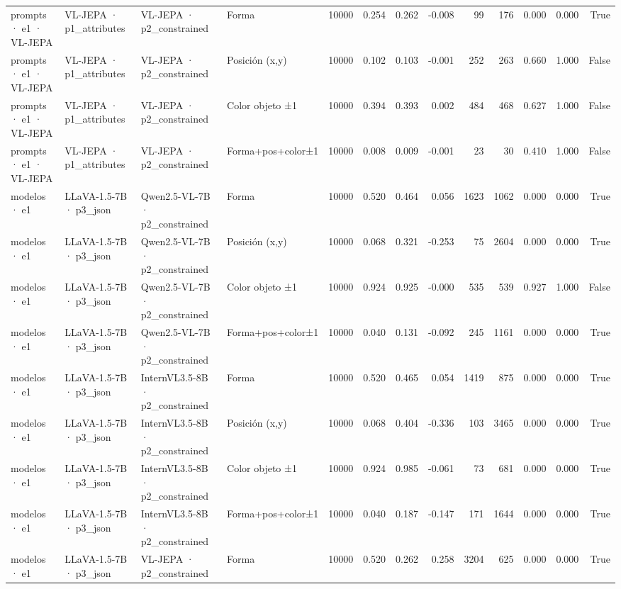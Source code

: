 \begin{tabular}{llllrrrrrrrrr}
prompts · e1 · VL-JEPA & VL-JEPA · p1\_attributes & VL-JEPA · p2\_constrained & Forma & 10000 & 0.254 & 0.262 & -0.008 & 99 & 176 & 0.000 & 0.000 & True \\
prompts · e1 · VL-JEPA & VL-JEPA · p1\_attributes & VL-JEPA · p2\_constrained & Posición (x,y) & 10000 & 0.102 & 0.103 & -0.001 & 252 & 263 & 0.660 & 1.000 & False \\
prompts · e1 · VL-JEPA & VL-JEPA · p1\_attributes & VL-JEPA · p2\_constrained & Color objeto ±1 & 10000 & 0.394 & 0.393 & 0.002 & 484 & 468 & 0.627 & 1.000 & False \\
prompts · e1 · VL-JEPA & VL-JEPA · p1\_attributes & VL-JEPA · p2\_constrained & Forma+pos+color±1 & 10000 & 0.008 & 0.009 & -0.001 & 23 & 30 & 0.410 & 1.000 & False \\
modelos · e1 & LLaVA-1.5-7B · p3\_json & Qwen2.5-VL-7B · p2\_constrained & Forma & 10000 & 0.520 & 0.464 & 0.056 & 1623 & 1062 & 0.000 & 0.000 & True \\
modelos · e1 & LLaVA-1.5-7B · p3\_json & Qwen2.5-VL-7B · p2\_constrained & Posición (x,y) & 10000 & 0.068 & 0.321 & -0.253 & 75 & 2604 & 0.000 & 0.000 & True \\
modelos · e1 & LLaVA-1.5-7B · p3\_json & Qwen2.5-VL-7B · p2\_constrained & Color objeto ±1 & 10000 & 0.924 & 0.925 & -0.000 & 535 & 539 & 0.927 & 1.000 & False \\
modelos · e1 & LLaVA-1.5-7B · p3\_json & Qwen2.5-VL-7B · p2\_constrained & Forma+pos+color±1 & 10000 & 0.040 & 0.131 & -0.092 & 245 & 1161 & 0.000 & 0.000 & True \\
modelos · e1 & LLaVA-1.5-7B · p3\_json & InternVL3.5-8B · p2\_constrained & Forma & 10000 & 0.520 & 0.465 & 0.054 & 1419 & 875 & 0.000 & 0.000 & True \\
modelos · e1 & LLaVA-1.5-7B · p3\_json & InternVL3.5-8B · p2\_constrained & Posición (x,y) & 10000 & 0.068 & 0.404 & -0.336 & 103 & 3465 & 0.000 & 0.000 & True \\
modelos · e1 & LLaVA-1.5-7B · p3\_json & InternVL3.5-8B · p2\_constrained & Color objeto ±1 & 10000 & 0.924 & 0.985 & -0.061 & 73 & 681 & 0.000 & 0.000 & True \\
modelos · e1 & LLaVA-1.5-7B · p3\_json & InternVL3.5-8B · p2\_constrained & Forma+pos+color±1 & 10000 & 0.040 & 0.187 & -0.147 & 171 & 1644 & 0.000 & 0.000 & True \\
modelos · e1 & LLaVA-1.5-7B · p3\_json & VL-JEPA · p2\_constrained & Forma & 10000 & 0.520 & 0.262 & 0.258 & 3204 & 625 & 0.000 & 0.000 & True \\

\end{tabular}
